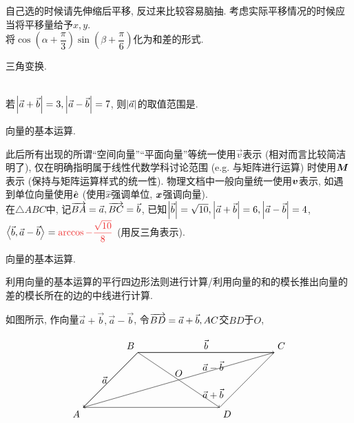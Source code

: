\documentclass[8pt]{article}
\begin{document}
		自己选的时候请先伸缩后平移, 反过来比较容易脑抽. 考虑实际平移情况的时候应当将平移量给予\(x, y\).
		~\\

		将\(\cos \left(\alpha + \dfrac{\pi}{3}\right) \sin \left(\beta + \dfrac{\pi}{6}\right)\)化为和差的形式.

		三角变换.

		~\\

		若\(\left\lvert \vec{a} + \vec{b} \right\rvert=3, \left\lvert \vec{a} - \vec{b} \right\rvert=7\), 则\(\left\lvert \vec{a} \right\rvert\)的取值范围是\answord{\([2, 5]\)}.

		向量的基本运算.

		此后所有出现的所谓“空间向量”“平面向量”等统一使用\(\vec{v}\)表示 (相对而言比较简洁明了), 仅在明确指明属于线性代数学科讨论范围 (e.g. 与矩阵进行运算) 时使用\(\boldsymbol{M}\)表示 (保持与矩阵运算样式的统一性). 物理文档中一般向量统一使用\(\boldsymbol{v}\)表示, 如遇到单位向量使用\(\hat{\boldsymbol{e}}\) (使用\(\hat{x}\)强调单位, \(\boldsymbol{x}\)强调向量).
		~\\

		在\(\triangle ABC\)中, 记\(\overrightarrow{BA}=\vec{a}, \overrightarrow{BC}=\vec{b}\), 已知\(\left\lvert \vec{b} \right\rvert=\sqrt{10}, \left\lvert \vec{a}+\vec{b} \right\rvert=6, \left\lvert \vec{a}-\vec{b} \right\rvert=4\), \(\ang{\vec{b}, \vec{a} - \vec{b}}=\ansmath{\arccos-\dfrac{\sqrt{10}}{8}}\) (用反三角表示).

		向量的基本运算.

		利用向量的基本运算的平行四边形法则进行计算/利用向量的和的模长推出向量的差的模长所在的边的中线进行计算.

		如图所示, 作向量\(\vec{a} + \vec{b}, \vec{a} - \vec{b}\), 令\(\overrightarrow{BD} = \vec{a} + \vec{b}, AC\)交\(BD\)于\(O\),

		\[
		\begin{tikzpicture}[scale=1]
			\draw[black] (0, 0)--(5, 0)--(3, -2)--(-2, -2)--(0, 0) node at (0, 0) [anchor = south east]{\(B\)} node at (5, 0) [anchor = south west]{\(C\)} node at (3, -2) [anchor = north west]{\(D\)} node at (-2, -2) [anchor = north east]{\(A\)} node at (2.5, 0) [anchor = south]{\(\vec{b}\)} node at (-1, -1) [anchor = east]{\(\vec{a}\)};
			\draw[black, ->] (0, 0)--(3, -2) node at (2.25, -1.5) [anchor = west]{\(\vec{a} + \vec{b}\)};
			\draw[black, ->] (5, 0)--(-2, -2) node at (1.5, -1) [anchor = south]{\(O\)} node at (2.25, -0.5) [anchor = west]{\(\vec{a} - \vec{b}\)};
			\draw[black, ->] (0, 0)--(5, 0);
			\draw[black, ->] (0, 0)--(-2, -2);
		\end{tikzpicture}
		\]
\end{document}
